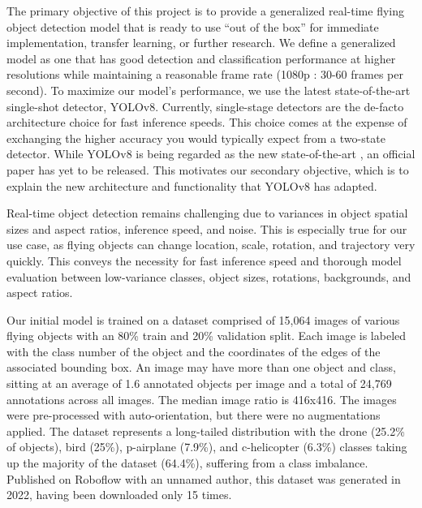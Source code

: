 \documentclass[10pt,twocolumn,letterpaper]{article}
\begin{document}
The primary objective of this project is to provide a generalized real-time flying object detection model that is ready to use ``out of the box'' for immediate implementation, transfer learning, or further research. We define a generalized model as one that has good detection and classification performance at higher resolutions while maintaining a reasonable frame rate (1080p : 30-60 frames per second). To maximize our model's performance, we use the latest state-of-the-art single-shot detector, YOLOv8. Currently, single-stage detectors are the de-facto architecture choice for fast inference speeds. This choice comes at the expense of exchanging the higher accuracy you would typically expect from a two-state detector. While YOLOv8 is being regarded as the new state-of-the-art \cite{YOLOv8Website}, an official paper has yet to be released. This motivates our secondary objective, which is to explain the new architecture and functionality that YOLOv8 has adapted. 

Real-time object detection remains challenging due to variances in object spatial sizes and aspect ratios, inference speed, and noise. This is especially true for our use case, as flying objects can change location, scale, rotation, and trajectory very quickly. This conveys the necessity for fast inference speed and thorough model evaluation between low-variance classes, object sizes, rotations, backgrounds, and aspect ratios.

Our initial model is trained on a dataset \cite{InitialDataset} comprised of 15,064 images of various flying objects with an 80\% train and 20\% validation split. Each image is labeled with the class number of the object and the coordinates of the edges of the associated bounding box. An image may have more than one object and class, sitting at an average of 1.6 annotated objects per image and a total of 24,769 annotations across all images. The median image ratio is 416x416. The images were pre-processed with auto-orientation, but there were no augmentations applied. The dataset represents a long-tailed distribution with the drone (25.2\% of objects), bird (25\%), p-airplane (7.9\%), and c-helicopter (6.3\%) classes taking up the majority of the dataset (64.4\%), suffering from a class imbalance. Published on Roboflow with an unnamed author, this dataset was generated in 2022, having been downloaded only 15 times.
\end{document}
